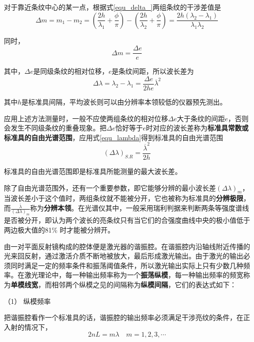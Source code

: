 \documentclass[UTF8]{ctexart}
\begin{document}
\noindent 对于靠近条纹中心的某一点，根据式\ref{equ_delta_}两组条纹的干涉差值是
\begin{equation}
\Delta m=m_{1}-m_{2}=\left(\frac{2 h}{\lambda_{1}}+\frac{\phi}{\pi}\right)-\left(\frac{2 h}{\lambda_{2}}+\frac{\phi}{\pi}\right)=\frac{2 h\left(\lambda_{2}-\lambda_{1}\right)}{\lambda_{1} \lambda_{2}}
\end{equation}

\noindent 同时，
\begin{equation}
	\Delta m =\frac{\Delta e}{e}
\end{equation}

\noindent 其中，$ \Delta e $是同级条纹的相对位移，$ e $是条纹间距，所以波长差为
\begin{equation}
	\Delta \lambda=\lambda_{2}-\lambda_{1}=\frac{\Delta e}{2 h e} \overline{\lambda}^{2}\label{equ_lambda}
\end{equation}

\noindent 其中$ h $是标准具间隔，平均波长则可以由分辨率本领较低的仪器预先测出。

	应用上述方法测量时，一般不应使两组条纹的相对位移$ \Delta e $大于条纹的间距$ e $，否则会发生不同级条纹的重叠现象。把$ \Delta e $恰好等于$ e $时对应的波长差称为\textbf{标准具常数或标准具的自由光谱范围}，应用式\ref{equ_lambda}得到标准具的自由光谱范围
	\begin{equation}
	(\Delta \lambda)_{S.R}=\frac{\overline{\lambda}^{2}}{2 h}
	\end{equation}
	
\noindent 标准具的自由光谱范围即是标准具所能测量的最大波长差。

	除了自由光谱范围外，还有一个重要参数，即它能够分辨的最小波长差$ (\Delta \lambda)_{m} $，当波长差小于这个值时，两组条纹就不能被分开，它也被称为标准具的\textbf{分辨极限}，而$ \frac{\overline{\lambda}}{(\Delta \lambda)_{m}} $称为\textbf{分辨本领}。在光谱仪其中，一般采用瑞利判据来判断两条等强度谱线是否被分开，即认为两个波长的亮条纹只有当它们的合强度曲线中央的极小值低于两边极大值的81\% 时才能被分辨开。
	
	由一对平面反射镜构成的腔体便是激光器的谐振腔。在谐振腔内沿轴线附近传播的光来回反射，通过激活介质不断地被放大，最后形成激光输出。由于激光的输出必须同时满足一定的频率条件和振荡阈值条件，所以激光输出实际上只有少数几种频率。在激光理论中，每一种输出频率称为一个\textbf{振荡纵模}，每一种输出频率的频宽称为\textbf{单模线宽}，而相邻两个纵模之见的间隔称为\textbf{纵模间隔}，它们的表达式如下：
	
	（1） 纵模频率
	
	把谐振腔看作一个标准具的话，谐振腔的输出频率必须满足干涉亮纹的条件，在正入射的情况下，
	\begin{equation}
		2 n L = m \lambda \quad m=1,2,3,\cdots
	\end{equation}
	
\end{document}
